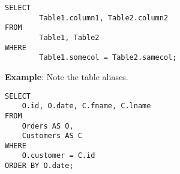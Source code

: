 \documentclass{article}
\begin{document}
         
\begin{lstlisting}[frame=single]  
SELECT 
        Table1.column1, Table2.column2 
FROM 
        Table1, Table2
WHERE 
        Table1.somecol = Table2.samecol;
\end{lstlisting} 
%
%      
  \textbf{Example}: Note the table aliases.          
                

\begin{lstlisting}[frame=single]  
SELECT 
    O.id, O.date, C.fname, C.lname
FROM
    Orders AS O,
    Customers AS C
WHERE
    O.customer = C.id
ORDER BY O.date;
\end{lstlisting} 
%
%                










  



 
\end{document}
